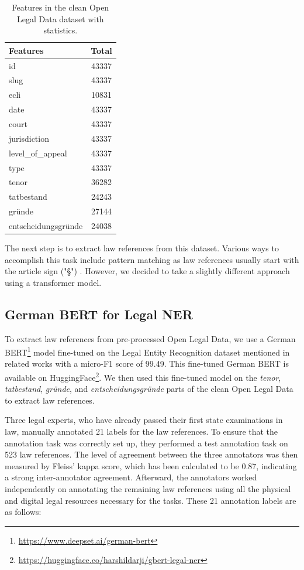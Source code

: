 \documentclass[sigconf]{acmart}
\begin{document}
\begin{table}[h]
\centering
\caption{Features in the clean Open Legal Data dataset with statistics.}
\label{tab:dataset-old}
\begin{tabular}{|l|c|}
\hline
\textbf{Features} & \textbf{Total} \\
\hline
id & 43337 \\
slug & 43337 \\
ecli & 10831 \\
date & 43337 \\
court & 43337 \\
jurisdiction & 43337 \\
level\_of\_appeal & 43337 \\
type & 43337 \\
tenor & 36282 \\
tatbestand & 24243 \\
gründe & 27144 \\
entscheidungsgründe & 24038 \\
\hline
\end{tabular}
\end{table}
The next step is to extract law references from this dataset. Various ways to accomplish this task include pattern matching as law references usually start with the article sign ("§") \cite{DBLP:conf/ic3k/MilzGM21}. However, we decided to take a slightly different approach using a transformer\cite{vaswani2017attention} model.

\subsection{German BERT for Legal NER}
To extract law references from pre-processed Open Legal Data, we use a German BERT\footnote{\url{https://www.deepset.ai/german-bert}} model fine-tuned on the Legal Entity Recognition dataset mentioned in related works with a micro-F1 score of 99.49\cite{icaart23}. This fine-tuned German BERT is available on HuggingFace\footnote{\url{https://huggingface.co/harshildarji/gbert-legal-ner}}. We then used this fine-tuned model on the  \textit{tenor}, \textit{tatbestand}, \textit{gründe}, and \textit{entscheidungsgründe} parts of the clean Open Legal Data to extract law references.

Three legal experts, who have already passed their first state examinations in law, manually annotated 21 labels for the law references. To ensure that the annotation task was correctly set up, they performed a test annotation task on 523 law references. The level of agreement between the three annotators was then measured by Fleiss' kappa score, which has been calculated to be 0.87, indicating a strong inter-annotator agreement. Afterward, the annotators worked independently on annotating the remaining law references using all the physical and digital legal resources necessary for the tasks. These 21 annotation labels are as follows:\\
\end{document}
